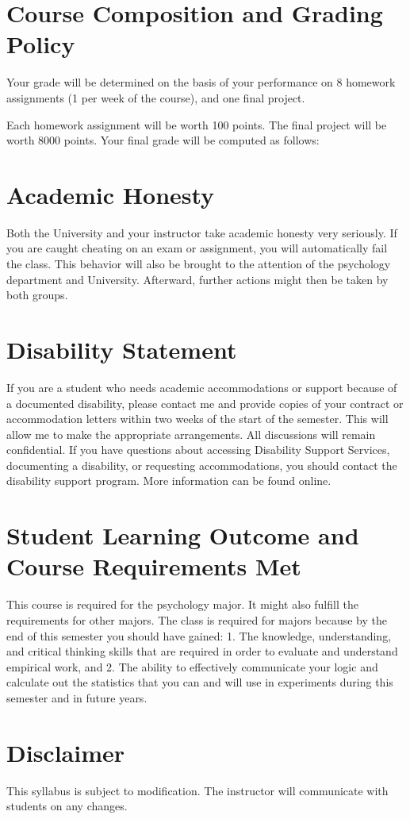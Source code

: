\documentclass{article}
\begin{document}
\section{Course Composition and Grading Policy}
Your grade will be determined on the basis of your performance on 8 homework
assignments (1 per week of the course), and one final project.

Each homework assignment will be worth 100 points. The final project will be
worth 8000 points. Your final grade will be computed as follows:


\section{Academic Honesty}
Both the University and your instructor take academic honesty very seriously. If
you are caught cheating on an exam or assignment, you will automatically fail
the class. This behavior will also be brought to the attention of the psychology
department and University. Afterward, further actions might then be taken by
both groups.

\section{Disability Statement}
If you are a student who needs academic accommodations or support because of a
documented disability, please contact me and provide copies of your contract
or accommodation letters within two weeks of the start of the semester. This
will allow me to make the appropriate arrangements. All discussions will remain
confidential. If you have questions about accessing Disability Support Services,
documenting a disability, or requesting accommodations, you should contact the
disability support program. More information can be found online.

\section{Student Learning Outcome and Course Requirements Met}
This course is required for the psychology major. It might also fulfill the
requirements for other majors. The class is required for majors because by the
end of this semester you should have gained: 1. The knowledge, understanding,
and critical thinking skills that are required in order to evaluate and
understand empirical work, and 2. The ability to effectively communicate your
logic and calculate out the statistics that you can and will use in experiments
during this semester and in future years.

\section{Disclaimer}
This syllabus is subject to modification. The instructor will communicate with
students on any changes.
\end{document}
